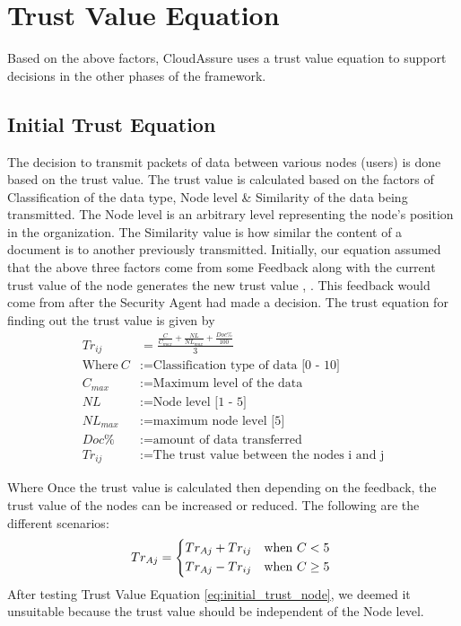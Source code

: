     \section{Trust Value Equation}
Based on the above factors, CloudAssure uses a trust value equation to support decisions in the other phases of the framework. 


\subsection{Initial Trust Equation}
The decision to transmit packets of data between various nodes (users) is done
based on the trust value. The trust value is calculated based on the factors of
Classification of the data type, Node level \& Similarity of the data being transmitted. The Node level is an arbitrary level representing the node's position in the organization. The Similarity value is how similar the content of a document is to another previously transmitted.
Initially, our equation assumed that the above three factors come from some
Feedback along with the current trust value of the node generates the new trust
value \autocite{L.Xiong2004}, \autocite{YanWang2007}. This feedback would come from after the Security Agent had made
a decision. The trust equation for finding out the trust value is given by
\begin{equation}
    \label{eq:init_trust}
    \begin{aligned}
         Tr_{ij}&=\frac{\frac{C}{C_{max}} + \frac{NL}{NL_{max}}
         + \frac{Doc\%}{100}}{3} \\
    \text{Where}~C &:= \text{Classification type of data [0 - 10]} \\
C_{max} &:= \text{Maximum level of the data} \\
NL &:= \text{Node level [1 - 5]} \\
NL_{max} &:= \text{maximum node level [5]} \\
Doc\% &:= \text{amount of data transferred} \\
Tr_{ij} &:= \text{The trust value between the nodes i and j}
\end{aligned}
\end{equation}



Where 
Once the trust value is calculated then depending on the feedback, the trust
value of the nodes can be increased or reduced. The following are the different
scenarios: 
\begin{equation}
   Tr_{Aj} =    \begin{dcases*}
                    Tr_{Aj} + Tr_{ij} & when $C < 5$\\
                    Tr_{Aj} - Tr_{ij} & when $C \ge 5$
                \end{dcases*}
                \label{eq:initial_trust_node}
\end{equation}
After testing Trust Value Equation \ref{eq:initial_trust_node}, we deemed it unsuitable because the trust value should be independent of the Node level. 


